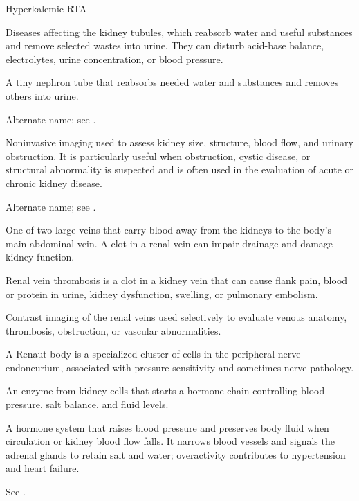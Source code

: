 \synonyms
Hyperkalemic RTA

 Diseases affecting the kidney tubules, which reabsorb water and useful substances and remove selected wastes into urine. They can disturb acid-base balance, electrolytes, urine concentration, or blood pressure.

 A tiny nephron tube that reabsorbs needed water and substances and removes others into urine.

 Alternate name; see .

 Noninvasive imaging used to assess kidney size, structure, blood flow, and urinary obstruction. It is
particularly useful when obstruction, cystic disease, or structural abnormality is
suspected and is often used in the evaluation of acute or chronic kidney disease.

 Alternate name; see .

 One of two large veins that carry blood away from the kidneys to the body’s main abdominal vein. A clot in a renal vein can impair drainage and damage kidney function.

 Renal vein thrombosis is a clot in a kidney vein that can cause flank pain, blood or protein in urine, kidney dysfunction, swelling, or pulmonary embolism.

 Contrast imaging of the renal veins used selectively to evaluate venous anatomy, thrombosis, obstruction, or vascular abnormalities.

 A Renaut body is a specialized cluster of cells in the peripheral nerve endoneurium, associated with pressure sensitivity and sometimes nerve pathology.

 An enzyme from kidney cells that starts a hormone chain controlling blood pressure, salt balance, and fluid levels.

 A hormone system that raises blood pressure and preserves body fluid when circulation or kidney blood flow falls. It narrows blood vessels and signals the adrenal glands to retain salt and water; overactivity contributes to hypertension and heart failure.

 See .

